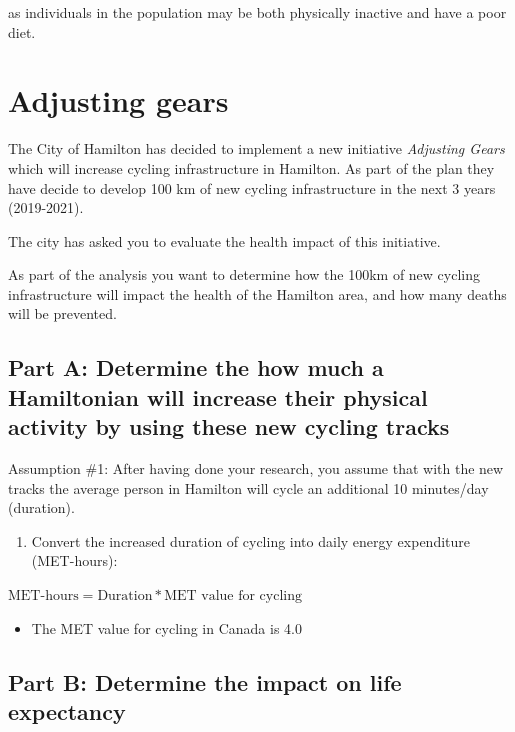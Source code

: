 \documentclass[]{book}
\providecommand{\tightlist}{%
  \setlength{\itemsep}{0pt}\setlength{\parskip}{0pt}}
\begin{document}
as individuals in the population may be both physically inactive and
have a poor diet.

\section{Adjusting gears}\label{adjusting-gears}

The City of Hamilton has decided to implement a new initiative
\emph{Adjusting Gears} which will increase cycling infrastructure in
Hamilton. As part of the plan they have decide to develop 100 km of new
cycling infrastructure in the next 3 years (2019-2021).

The city has asked you to evaluate the health impact of this initiative.

As part of the analysis you want to determine how the 100km of new
cycling infrastructure will impact the health of the Hamilton area, and
how many deaths will be prevented.

\subsection{Part A: Determine the how much a Hamiltonian will increase
their physical activity by using these new cycling
tracks}\label{part-a-determine-the-how-much-a-hamiltonian-will-increase-their-physical-activity-by-using-these-new-cycling-tracks}

Assumption \#1: After having done your research, you assume that with
the new tracks the average person in Hamilton will cycle an additional
10 minutes/day (duration).

\begin{enumerate}
\def\labelenumi{\arabic{enumi}.}
\tightlist
\item
  Convert the increased duration of cycling into daily energy
  expenditure (MET-hours):
\end{enumerate}

\(\text{MET-hours} = \text{Duration}*\text{MET value for cycling}\)

\begin{itemize}
\tightlist
\item
  The MET value for cycling in Canada is 4.0
\end{itemize}

\subsection{Part B: Determine the impact on life
expectancy}\label{part-b-determine-the-impact-on-life-expectancy}
\end{document}
